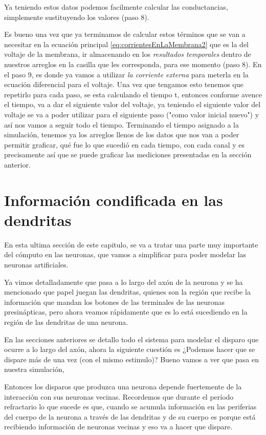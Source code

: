 Ya teniendo estos datos podemos facilmente calcular las conductancias, simplemente sustituyendo los valores (paso 8).

Es bueno una vez que ya terminamos de calcular estos términos que se van a necesitar en la ecuación principal  \ref{eq:corrientesEnLaMembrana2} que es la del voltaje de la membrana,  ir almacenando en los \emph{resultados temporales} dentro de nuestros arreglos en la casilla que les corresponda, para ese momento (paso 8). En el paso 9, es donde ya vamos a utilizar \emph{la corriente externa} para meterla en la ecuación diferencial para el voltaje. Una vez que tengamos esto tenemos que repetirlo para cada paso, se esta calculando el tiempo t,  entonces conforme avence el tiempo, va a dar el siguiente valor del voltaje, ya teniendo el siguiente valor del voltaje se va a poder utilizar para el siguiente paso ("como valor inicial nuevo") y así nos vamos a seguir todo el tiempo. 
Terminando el tiempo asignado a la simulación, tenemos ya los arreglos llenos de los datos que nos van a poder permitir graficar, qué fue lo que sucedió en cada tiempo, con cada canal y es precisamente  así que se puede graficar las mediciones presentadas en la sección anterior.

\section{Información condificada en las dendritas}

En esta ultima sección de este capitulo, se va a tratar una parte muy importante del cómputo en las neuronas, que vamos a simplificar para poder modelar las neuronas artificiales.

Ya vimos detalladamente que pasa a lo largo del axón de la neurona y se ha mencionado
que papel juegan las dendritas, quienes son la región que recibe la información que
mandan los botones de las terminales de las neuronas presinápticas, pero ahora veamos rápidamente que es lo está sucediendo en la región de las dendritas de una neurona.

En las secciones anteriores se detallo todo el sistema para modelar el disparo que ocurre a
lo largo del axón, ahora la siguiente cuestión es ¿Podemos hacer que se dispare más de
una vez (con el mismo estimulo)? Bueno vamos a ver que pasa en nuestra simulación,

Entonces los disparos que produzca una neurona depende fuertemente de la interacción con sus neuronas vecinas. Recordemos que durante el período refractario lo que sucede es que, cuando se acumula información en las periferias del cuerpo de la neurona a través de las dendritas y de su cuerpo es porque está recibiendo información de neuronas vecinas
y eso va a hacer que dispare.

